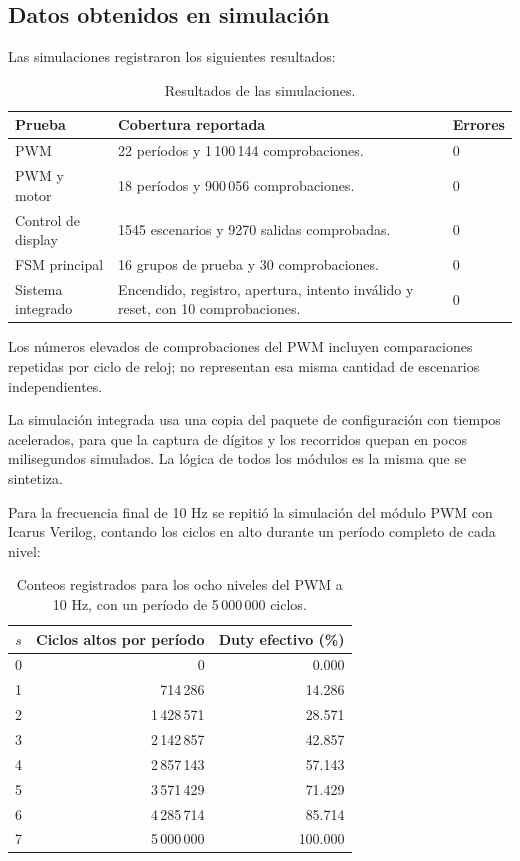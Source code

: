 \documentclass[12pt,letterpaper]{article}
\begin{document}
\subsection{Datos obtenidos en simulación}

Las simulaciones registraron los siguientes resultados:

\begin{table}[H]
\centering
\small
\begin{tabularx}{\textwidth}{@{}p{3.4cm}Yp{1.6cm}@{}}
\toprule
Prueba & Cobertura reportada & Errores\\
\midrule
PWM &
22 períodos y 1\,100\,144 comprobaciones. &
0\\
PWM y motor &
18 períodos y 900\,056 comprobaciones. &
0\\
Control de display &
1545 escenarios y 9270 salidas comprobadas. &
0\\
FSM principal &
16 grupos de prueba y 30 comprobaciones. &
0\\
Sistema integrado &
Encendido, registro, apertura, intento inválido y
reset, con 10 comprobaciones. &
0\\
\bottomrule
\end{tabularx}
\caption{Resultados de las simulaciones.}
\end{table}

Los números elevados de comprobaciones del PWM incluyen
comparaciones repetidas por ciclo de reloj; no representan
esa misma cantidad de escenarios independientes.

La simulación integrada usa una copia del paquete de
configuración con tiempos acelerados, para que la captura
de dígitos y los recorridos quepan en pocos milisegundos
simulados. La lógica de todos los módulos es la misma que
se sintetiza.

Para la frecuencia final de 10 Hz se repitió la simulación
del módulo PWM con Icarus Verilog, contando los ciclos en
alto durante un período completo de cada nivel:

\begin{table}[H]
\centering
\begin{tabular}{@{}crr@{}}
\toprule
$s$ & Ciclos altos por período & Duty efectivo (\%)\\
\midrule
0 & 0 & 0.000\\
1 & 714\,286 & 14.286\\
2 & 1\,428\,571 & 28.571\\
3 & 2\,142\,857 & 42.857\\
4 & 2\,857\,143 & 57.143\\
5 & 3\,571\,429 & 71.429\\
6 & 4\,285\,714 & 85.714\\
7 & 5\,000\,000 & 100.000\\
\bottomrule
\end{tabular}
\caption{Conteos registrados para los ocho niveles del PWM
a 10 Hz, con un período de 5\,000\,000 ciclos.}
\end{table}
\end{document}
